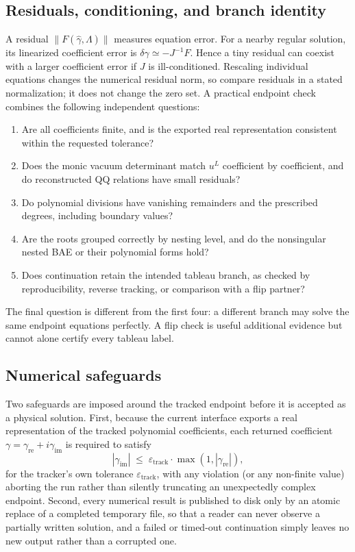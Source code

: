 \documentclass[11pt]{article}
\begin{document}
\subsection{Residuals, conditioning, and branch identity}

A residual $\|F(\widehat\gamma,\Lambda)\|$ measures equation error.
For a nearby regular solution, its linearized coefficient error is
$\delta\gamma\simeq-J^{-1}F$. Hence a tiny residual can coexist with a
larger coefficient error if $J$ is ill-conditioned. Rescaling individual
equations changes the numerical residual norm, so compare residuals in
a stated normalization; it does not change the zero set.
A practical endpoint check combines the following independent questions:
\begin{enumerate}
 \item Are all coefficients finite, and is the exported real
       representation consistent within the requested tolerance?
 \item Does the monic vacuum determinant match $u^L$ coefficient by
       coefficient, and do reconstructed QQ relations have small residuals?
 \item Do polynomial divisions have vanishing remainders and the prescribed
       degrees, including boundary values?
 \item Are the roots grouped correctly by nesting level, and do the
       nonsingular nested BAE or their polynomial forms hold?
 \item Does continuation retain the intended tableau branch, as checked
       by reproducibility, reverse tracking, or comparison with a flip partner?
\end{enumerate}
The final question is different from the first four: a different branch
may solve the same endpoint equations perfectly. A flip check is useful
additional evidence but cannot alone certify every tableau label.

\subsection{Numerical safeguards}

Two safeguards are imposed around the tracked endpoint before it is
accepted as a physical solution. First, because the current interface exports a real representation of the
tracked polynomial coefficients,
each returned coefficient $\gamma=\gamma_{\mathrm{re}}+i\gamma_{\mathrm{im}}$
is required to satisfy
\begin{equation}
  \label{eq:real-check}
  |\gamma_{\mathrm{im}}| \;\le\; \varepsilon_{\mathrm{track}}\cdot\max(1,|\gamma_{\mathrm{re}}|),
\end{equation}
for the tracker's own tolerance $\varepsilon_{\mathrm{track}}$, with any
violation (or any non-finite value) aborting the run rather than
silently truncating an unexpectedly complex endpoint. Second, every
numerical result is published to disk only by an atomic replace of a
completed temporary file, so that a reader can never observe a partially
written solution, and a failed or timed-out continuation simply leaves no
new output rather than a corrupted one.
\end{document}
